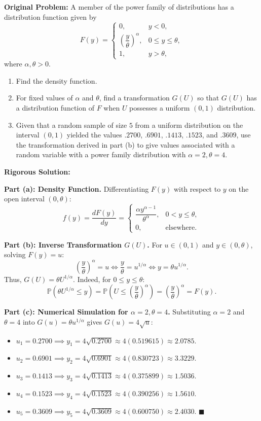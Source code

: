 \documentclass[11pt, letterpaper]{article}
\theoremstyle{definition}
\theoremstyle{remark}
\newcommand{\Prob}{\mathbb{P}}
\begin{document}
\textbf{Original Problem:}
A member of the power family of distributions has a distribution function given by
\[
    F(y) = \begin{cases} 0, & y < 0, \\ \left(\dfrac{y}{\theta}\right)^\alpha, & 0 \le y \le \theta, \\[8pt] 1, & y > \theta, \end{cases}
\]
where $\alpha, \theta > 0$.
\begin{enumerate}[label=\textbf{\alph*}]
    \item Find the density function.
    \item For fixed values of $\alpha$ and $\theta$, find a transformation $G(U)$ so that $G(U)$ has a distribution function of $F$ when $U$ possesses a uniform $(0, 1)$ distribution.
    \item Given that a random sample of size $5$ from a uniform distribution on the interval $(0, 1)$ yielded the values $.2700$, $.6901$, $.1413$, $.1523$, and $.3609$, use the transformation derived in part (b) to give values associated with a random variable with a power family distribution with $\alpha = 2, \theta = 4$.
\end{enumerate}

\hrulefill

\textbf{Rigorous Solution:}

\textbf{Part (a): Density Function.}
Differentiating $F(y)$ with respect to $y$ on the open interval $(0, \theta)$:
\[
    f(y) = \frac{dF(y)}{dy} = \begin{cases} \dfrac{\alpha y^{\alpha - 1}}{\theta^\alpha}, & 0 < y \le \theta, \\[6pt] 0, & \text{elsewhere.} \end{cases}
\]

\textbf{Part (b): Inverse Transformation $G(U)$.}
For $u \in (0, 1)$ and $y \in (0, \theta)$, solving $F(y) = u$:
\[
    \left(\frac{y}{\theta}\right)^\alpha = u \iff \frac{y}{\theta} = u^{1/\alpha} \iff y = \theta u^{1/\alpha}.
\]
Thus, $G(U) = \theta U^{1/\alpha}$. Indeed, for $0 \le y \le \theta$:
\[
    \Prob(\theta U^{1/\alpha} \le y) = \Prob\left(U \le \left(\frac{y}{\theta}\right)^\alpha\right) = \left(\frac{y}{\theta}\right)^\alpha = F(y).
\]

\textbf{Part (c): Numerical Simulation for $\alpha = 2, \theta = 4$.}
Substituting $\alpha = 2$ and $\theta = 4$ into $G(u) = \theta u^{1/\alpha}$ gives $G(u) = 4\sqrt{u}$:
\begin{itemize}
    \item $u_1 = 0.2700 \implies y_1 = 4\sqrt{0.2700} \approx 4(0.519615) \approx 2.0785$.
    \item $u_2 = 0.6901 \implies y_2 = 4\sqrt{0.6901} \approx 4(0.830723) \approx 3.3229$.
    \item $u_3 = 0.1413 \implies y_3 = 4\sqrt{0.1413} \approx 4(0.375899) \approx 1.5036$.
    \item $u_4 = 0.1523 \implies y_4 = 4\sqrt{0.1523} \approx 4(0.390256) \approx 1.5610$.
    \item $u_5 = 0.3609 \implies y_5 = 4\sqrt{0.3609} \approx 4(0.600750) \approx 2.4030$. \hfill $\blacksquare$
\end{itemize}
\end{document}
